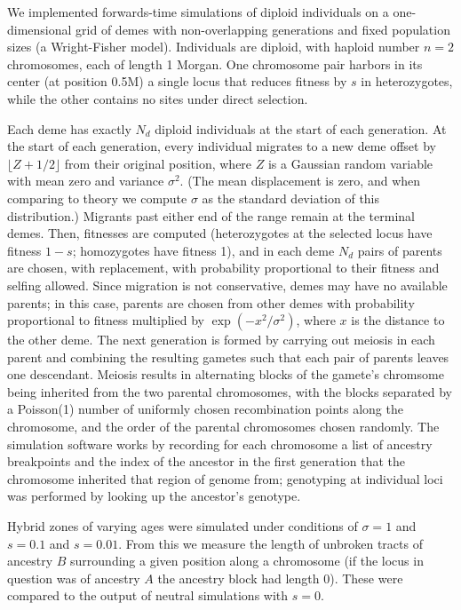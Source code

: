 \documentclass[11pt,letterpaper]{article}
\begin{document}
We implemented forwards-time simulations of diploid individuals on a one-dimensional grid of demes
with non-overlapping generations and fixed population sizes (a Wright-Fisher model). Individuals are diploid, with haploid number $n=2$ chromosomes, each of length 1 Morgan. One chromosome pair harbors in its center (at position 0.5M) a single locus that reduces fitness by $s$ in heterozygotes, while the other contains no sites under direct selection.

Each deme has exactly $N_d$ diploid individuals at the start of each generation.
At the start of each generation, every individual migrates to a new deme  offset by $\lfloor Z + 1/2 \rfloor$ from their original position,
where $Z$ is a Gaussian random variable with mean zero and variance $\sigma^2$.
(The mean displacement is zero, and when comparing to theory we compute $\sigma$ as the standard deviation of this distribution.)
Migrants past either end of the range remain at the terminal demes.
Then, 
fitnesses are computed (heterozygotes at the selected locus have fitness $1-s$; homozygotes have fitness 1),
and in each deme $N_d$ pairs of parents are chosen, with replacement,
with probability proportional to their fitness and selfing allowed.
Since migration is not conservative, demes may have no available parents;
in this case, parents are chosen from other demes with probability proportional to fitness
multiplied by $\exp(-x^2/\sigma^2)$, where $x$ is the distance to the other deme.
The next generation is formed by carrying out meiosis in each parent
and combining the resulting gametes such that each pair of parents leaves one descendant.
Meiosis results in alternating blocks of the gamete's chromsome
being inherited from the two parental chromosomes,
with the blocks separated by a Poisson(1) number of uniformly chosen recombination points along the chromosome,
and the order of the parental chromosomes chosen randomly.
The simulation software works by recording for each chromosome
a list of ancestry breakpoints and the index of the ancestor in the first generation
that the chromosome inherited that region of genome from;
genotyping at individual loci was performed by looking up the ancestor's genotype.

Hybrid zones of varying ages were simulated under conditions of $\sigma=1$ and $s=0.1$ and $s=0.01$. From this we measure the length of unbroken tracts of ancestry $B$ surrounding a given position along a chromosome (if the locus in question was of ancestry $A$ the ancestry block had length $0$). These were compared to the output of neutral simulations with $s=0$.
\end{document}
